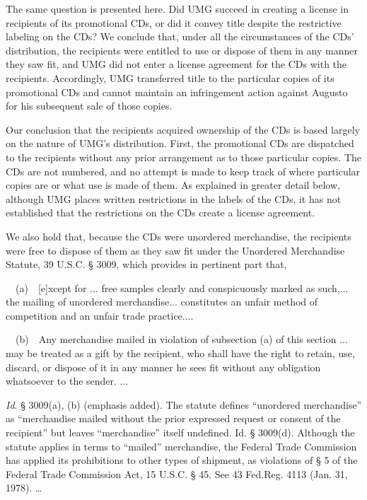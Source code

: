 The same question is presented here. Did UMG succeed in creating a license in
recipients of its promotional CDs, or did it convey title despite the
restrictive labeling on the CDs? We conclude that, under all the circumstances
of the CDs' distribution, the recipients were entitled to use or dispose of
them in any manner they saw fit, and UMG did not enter a license agreement for
the CDs with the recipients. Accordingly, UMG transferred title to the
particular copies of its promotional CDs and cannot maintain an infringement
action against Augusto for his subsequent sale of those copies.

Our conclusion that the recipients acquired ownership of the CDs is based
largely on the nature of UMG's distribution. First, the promotional CDs are
dispatched to the recipients without any prior arrangement as to those
particular copies. The CDs are not numbered, and no attempt is made to keep
track of where particular copies are or what use is made of them. As explained
in greater detail below, although UMG places written restrictions in the labels
of the CDs, it has not established that the restrictions on the CDs create a
license agreement.

We also hold that, because the CDs were unordered merchandise, the recipients
were free to dispose of them as they saw fit under the Unordered Merchandise
Statute, 39 U.S.C. {\S} 3009, which provides in pertinent part that,

\ \ (a)\ \ [e]xcept for ... free samples clearly and conspicuously marked as
such,... the mailing of unordered merchandise... constitutes an unfair method
of competition and an unfair trade practice....

\ \ (b)\ \ Any merchandise mailed in violation of subsection (a) of this section
... may be treated as a gift by the recipient, who shall have the right to
retain, use, discard, or dispose of it in any manner he sees fit without any
obligation whatsoever to the sender. ...

\textit{Id}. {\S} 3009(a), (b) (emphasis added). The statute defines ``unordered
merchandise'' as ``merchandise mailed without the prior expressed request or
consent of the recipient'' but leaves ``merchandise'' itself undefined. Id.
{\S} 3009(d). Although the statute applies in terms to ``mailed'' merchandise,
the Federal Trade Commission has applied its prohibitions to other types of
shipment, as violations of {\S} 5 of the Federal Trade Commission Act, 15
U.S.C. {\S} 45. See 43 Fed.Reg. 4113 (Jan. 31, 1978). {\dots}

